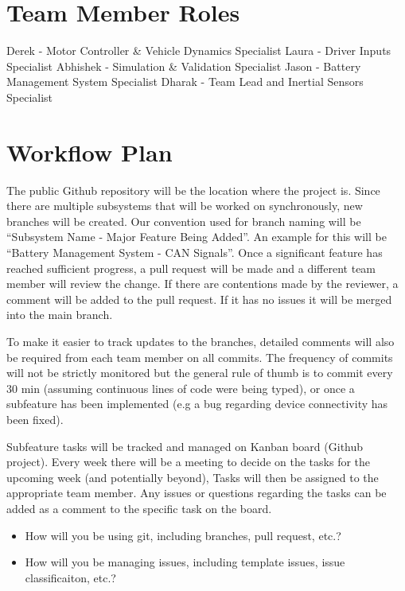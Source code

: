 \documentclass{article}
\begin{document}
\section{Team Member Roles}

Derek - Motor Controller & Vehicle Dynamics Specialist
Laura - Driver Inputs Specialist
Abhishek - Simulation & Validation Specialist
Jason - Battery Management System Specialist
Dharak - Team Lead and Inertial Sensors Specialist

\section{Workflow Plan}

The public Github repository will be the location where the project is.
Since there are multiple subsystems that will be worked on synchronously,
new branches will be created. Our convention used for branch naming will be
“Subsystem Name - Major Feature Being Added”. An example for this will be 
“Battery Management System - CAN Signals”. Once a significant feature has 
reached sufficient progress, a pull request will be made and a different 
team member will review the change. If there are contentions made by the 
reviewer, a comment will be added to the pull request. If it has no issues 
it will be merged into the main branch.


To make it easier to track updates to the branches, detailed comments will 
also be required from each team member on all commits. The frequency of 
commits will not be strictly monitored but the general rule of thumb is to
commit every 30 min (assuming continuous lines of code were being typed), 
or once a subfeature has been implemented (e.g a bug regarding device 
connectivity has been fixed). 

Subfeature tasks will be tracked and managed on Kanban board (Github 
project). Every week there will be a meeting to decide on the tasks for the
upcoming week (and potentially beyond), Tasks will then be assigned to the 
appropriate team member. Any issues or questions regarding the tasks can be 
added as a comment to the specific task on the board.

\begin{itemize}
	\item How will you be using git, including branches, pull request, etc.?
	\item How will you be managing issues, including template issues, issue
	classificaiton, etc.?
\end{itemize}
\end{document}
